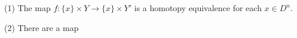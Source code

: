 (1) The map $f: \{x\} \times Y \rightarrow \{x\} \times Y'$ is a homotopy equivalence for each $x \in D^n$.

(2) There are a map
